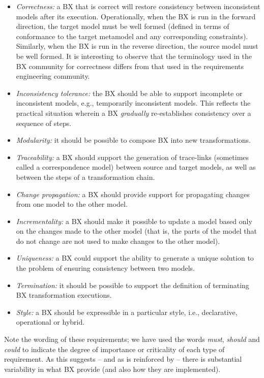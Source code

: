 \begin{itemize}
\item \textit{Correctness:} a BX that is correct will restore consistency between inconsistent models after its execution. Operationally, when the BX is run in the forward direction, the target model must be well formed (defined in terms of conformance to the target metamodel and any corresponding constraints). Similarly, when the BX is run in the reverse direction, the source model must be well formed. It is interesting to observe that the terminology used in the BX community for correctness differs from that used in the requirements engineering community.

\item \textit{Inconsistency tolerance:} the BX should be able to support incomplete or inconsistent models, e.g., temporarily inconsistent models. This reflects the practical situation wherein a BX \textit{gradually} re-establishes consistency over a sequence of steps.

\item \textit{Modularity:} it should be possible to compose BX into new transformations.

\item \textit{Traceability:} a BX should support the generation of trace-links (sometimes called a correspondence model) between source and target models, as well as between the steps of a transformation chain.

\item \textit{Change propagation:} a BX should provide support for propagating changes from one model to the other model. 

\item \textit{Incrementality:} a BX should make it possible to update a model based only on the changes made to the other model (that is, the parts of the model that do not change are not used to make changes to the other model). 

\item \textit{Uniqueness:} a BX could support the ability to generate a unique solution to the problem of ensuring consistency between two models.

\item \textit{Termination:} it should be possible to support the definition of terminating BX transformation executions.

\item \textit{Style:} a BX should be expressible in a particular style, i.e., declarative, operational or hybrid. 
\end{itemize}
Note the wording of these requirements; we have used the words \textit{must}, \textit{should} and \textit{could} to indicate the degree of importance or criticality of each type of requirement. As this suggests -- and as is reinforced by \cite{HidakaTCH16} -- there is substantial variability in what BX provide (and also how they are implemented).


